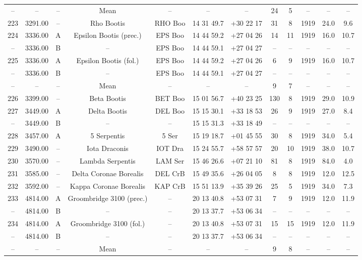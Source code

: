 \begin{table}
\begin{tabular}{cccccccccccc}
-- & -- & -- & Mean & -- & -- & -- & 24 & 5 & -- & -- & -- \\
223 & 3291.00 & -- & Rho Bootis & RHO Boo & 14 31 49.7 & +30 22 17 & 31 & 8 & 1919 & 24.0 & 9.6 \\
224 & 3336.00 & A & Epsilon Bootis (prec.) & EPS Boo & 14 44 59.2 & +27 04 26 & 14 & 11 & 1919 & 16.0 & 10.7 \\
-- & 3336.00 & B & -- & EPS Boo & 14 44 59.1 & +27 04 27 & -- & -- & -- & -- & -- \\
225 & 3336.00 & A & Epsilon Bootis (fol.) & EPS Boo & 14 44 59.2 & +27 04 26 & 6 & 9 & 1919 & 16.0 & 10.7 \\
-- & 3336.00 & B & -- & EPS Boo & 14 44 59.1 & +27 04 27 & -- & -- & -- & -- & -- \\
-- & -- & -- & Mean & -- & -- & -- & 9 & 7 & -- & -- & -- \\
226 & 3399.00 & -- & Beta Bootis & BET Boo & 15 01 56.7 & +40 23 25 & 130 & 8 & 1919 & 29.0 & 10.9 \\
227 & 3449.00 & A & Delta Bootis & DEL Boo & 15 15 30.1 & +33 18 53 & 26 & 9 & 1919 & 27.0 & 8.4 \\
-- & 3449.00 & B & -- & -- & 15 15 31.3 & +33 18 49 & -- & -- & -- & -- & -- \\
228 & 3457.00 & A & 5 Serpentis & 5 Ser & 15 19 18.7 & +01 45 55 & 30 & 8 & 1919 & 34.0 & 5.4 \\
229 & 3490.00 & -- & Iota Draconis & IOT Dra & 15 24 55.7 & +58 57 57 & 20 & 10 & 1919 & 38.0 & 10.7 \\
230 & 3570.00 & -- & Lambda Serpentis & LAM Ser & 15 46 26.6 & +07 21 10 & 81 & 8 & 1919 & 84.0 & 4.0 \\
231 & 3585.00 & -- & Delta Coronae Borealis & DEL CrB & 15 49 35.6 & +26 04 05 & 8 & 8 & 1919 & 12.0 & 12.5 \\
232 & 3592.00 & -- & Kappa Coronae Borealis & KAP CrB & 15 51 13.9 & +35 39 26 & 25 & 5 & 1919 & 34.0 & 7.3 \\
233 & 4814.00 & A & Groombridge 3100 (prec.) & -- & 20 13 40.8 & +53 07 31 & 7 & 9 & 1919 & 12.0 & 11.9 \\
-- & 4814.00 & B & -- & -- & 20 13 37.7 & +53 06 34 & -- & -- & -- & -- & -- \\
234 & 4814.00 & A & Groombridge 3100 (fol.) & -- & 20 13 40.8 & +53 07 31 & 15 & 15 & 1919 & 12.0 & 11.9 \\
-- & 4814.00 & B & -- & -- & 20 13 37.7 & +53 06 34 & -- & -- & -- & -- & -- \\
-- & -- & -- & Mean & -- & -- & -- & 9 & 8 & -- & -- & -- \\

\end{tabular}
\end{table}
